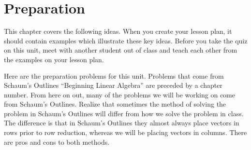 \section{Preparation}

\noindent
This chapter covers the following ideas. When you create your lesson plan, it should contain examples which illustrate these key ideas. Before you take the quiz on this unit, meet with another student out of class and teach each other from the examples on your lesson plan. 



Here are the preparation problems for this unit.  Problems that come from Schaum's Outlines ``Beginning Linear Algebra'' are preceded by a chapter number. From here on out, many of the problems we will be working on come from Schaum's Outlines.  Realize that sometimes the method of solving the problem in Schaum's Outlines will differ from how we solve the problem in class. The difference is that in Schaum's Outlines they almost always place vectors in rows prior to row reduction, whereas we will be placing vectors in columns. There are pros and cons to both methods. 



